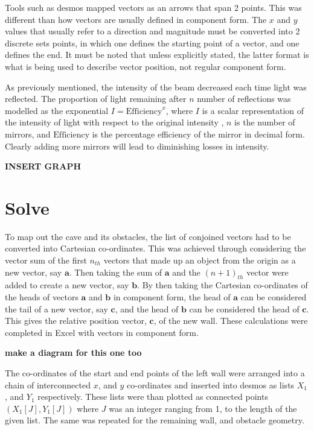 \documentclass[11pt, letterpaper]{article}
\begin{document}
		 Tools such as desmos mapped vectors as an arrows that span 2 points. This was different than how vectors are usually defined  in component form. The $x$ and $y$ values that usually refer to a direction and magnitude must be converted into 2 discrete sets points, in which one defines the starting point of a vector, and one defines the end. It must be noted that unless explicitly stated, the latter format is what is being used to describe vector position, not regular component form.
		
			As previously mentioned, the intensity of the beam decreased each time light was reflected. The proportion of light remaining after $n$ number of reflections was modelled as the exponential $I=\textrm{Efficiency}^x$, where $I$ is a scalar representation of the intensity of light with respect to the original intensity , $n$ is the number of mirrors, and $\textrm{Efficiency}$ is the percentage efficiency of the mirror in decimal form. Clearly  adding more mirrors will lead to diminishing losses in intensity.
		
		\textbf{INSERT GRAPH}
		
		
	
	
	
	\par 
	
	
	\section{Solve}
	
	\par 
	
		
To map out the cave and its obstacles, the list of conjoined vectors had to be converted into Cartesian co-ordinates. This was achieved through considering the vector sum of the first $n_{th}$ vectors that made up an object from the origin as a new vector, say  $\textbf{a}$. Then taking the sum of $\textbf{a}$ and the $(n+1)_{th}$ vector were added to create a new vector, say $\textbf{b}$. By then taking the Cartesian co-ordinates of the heads of vectors $\textbf{a}$ and $\textbf{b}$ in component form, the head of $\textbf{a} $ can be considered the tail of a new vector, say $\textbf{c}$, and the head of $\textbf{b}$ can be considered the head of $\textbf{c}$. This gives the relative position vector, $\textbf{c}$, of the new wall. These calculations were completed in Excel with vectors in component form. 

\textbf{make a diagram for this one too}
		

		 The co-ordinates of the start and end points of the left wall were arranged into a chain of interconnected $x$, and $y$ co-ordinates and inserted into desmos as lists $X_1$, and $Y_1$ respectively. These lists were than plotted as connected points $(X_1 [J], Y_1 [J])$ where $J$ was an integer ranging from 1, to the length of the given list. The same was repeated for the remaining wall, and obstacle geometry.
		
\end{document}
